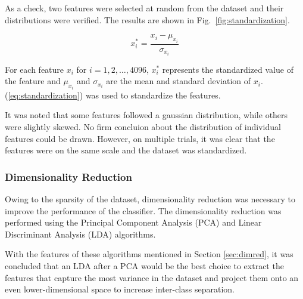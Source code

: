 \documentclass[conference]{IEEEtran}
\begin{document}
    As a check, two features were selected at random from the dataset and their distributions were verified.
    The results are shown in Fig.~\ref{fig:standardization}.

    \begin{equation}
        \label{eq:standardization}
        x_{i}^{*} = \frac{x_{i} - \mu_{x_{i}}}{\sigma_{x_{i}}}
    \end{equation}

    For each feature $x_{i}$ for $i = 1, 2, \dots, 4096$, $x_{i}^{*}$ represents the standardized value of the feature
    and $\mu_{x_{i}}$ and $\sigma_{x_{i}}$ are the mean and standard deviation of $x_{i}$.
    (\ref{eq:standardization}) was used to standardize the features.

    It was noted that some features followed a gaussian distribution, while others were slightly skewed.
    No firm concluion about the distribution of individual features could be drawn.
    However, on multiple trials, it was clear that the features were on the same scale and the dataset was standardized.

    \subsubsection{Dimensionality Reduction}
    \label{sec:dimreduction}
    Owing to the sparsity of the dataset, dimensionality reduction was necessary to improve the performance of the classifier.
    The dimensionality reduction was performed using the Principal Component Analysis (PCA) and
    Linear Discriminant Analysis (LDA) algorithms.

    With the features of these algorithms mentioned in Section \ref{sec:dimred}, it was concluded that an LDA
    after a PCA would be the best choice to extract the features that capture the most variance in the dataset and
    project them onto an even lower-dimensional space to increase inter-class separation.
\end{document}
